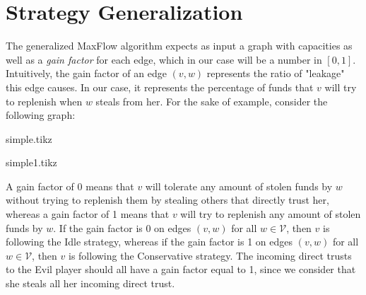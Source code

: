 \section{Strategy Generalization}
  The generalized MaxFlow algorithm expects as input a graph with capacities as well as a \textit{gain factor} for each edge,
  which in our case will be a number in $\left[0, 1\right]$. Intuitively, the gain factor of an edge $\left(v, w\right)$
  represents the ratio of "leakage" this edge causes. In our case, it represents the percentage of funds that $v$ will try to
  replenish when $w$ steals from her. For the sake of example, consider the following graph:
  
  {simple.tikz}
  
  {simple1.tikz}

  A gain factor of 0 means that $v$ will tolerate any amount of stolen funds by $w$ without trying to replenish them by stealing
  others that directly trust her, whereas a gain factor of 1 means that $v$ will try to replenish any amount of stolen funds by
  $w$. If the gain factor is 0 on edges $\left(v, w\right)$ for all $w \in \mathcal{V}$, then $v$ is following the Idle
  strategy, whereas if the gain factor is 1 on edges $\left(v, w\right)$ for all $w \in \mathcal{V}$, then $v$ is following the
  Conservative strategy. The incoming direct trusts to the Evil player should all have a gain factor equal to 1, since we
  consider that she steals all her incoming direct trust.
